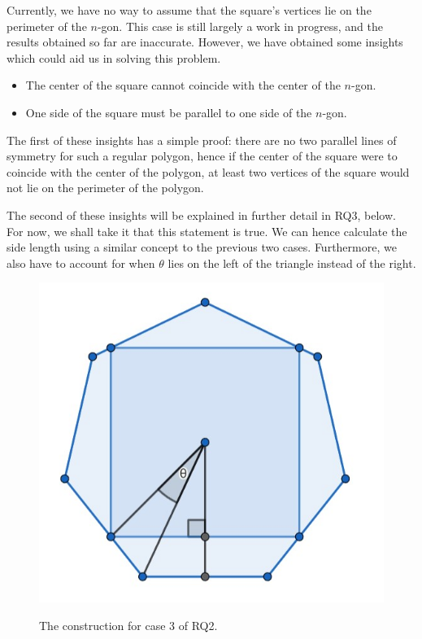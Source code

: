 \documentclass[12pt]{scrartcl}
\begin{document}
Currently, we have no way to assume that the square's vertices lie on the perimeter of the $n$-gon.
This case is still largely a work in progress, and the results obtained so far are inaccurate. However, we have obtained some insights which could aid us in solving this problem.

\begin{itemize}
	\item The center of the square cannot coincide with the center of the $n$-gon.
	\item One side of the square must be parallel to one side of the $n$-gon.
\end{itemize}

The first of these insights has a simple proof: there are no two parallel lines of symmetry for such a regular polygon, hence if the center of the square were to coincide with the center of the polygon, at least two vertices of the square would not lie on the perimeter of the polygon.

The second of these insights will be explained in further detail in RQ3, below. For now, we shall take it that this statement is true. We can hence calculate the side length using a similar concept to the previous two cases. Furthermore, we also have to account for when $\theta$ lies on the left of the triangle instead of the right.

\begin{figure}[htpb]
	\centering
	\includegraphics[scale=.75]{images/rq2_3.jpg}
	\label{fig:rq2_3_img}
	\caption{The construction for case 3 of RQ2.}
\end{figure}
\end{document}
